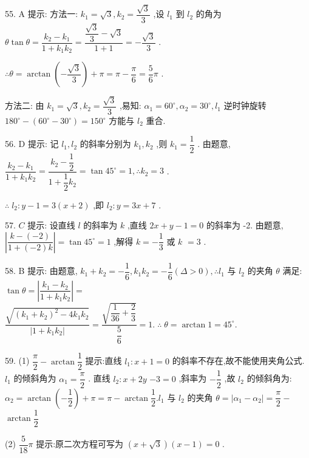 55. A 提示: 方法一: ${k}_{1} = \sqrt{3},{k}_{2} = \dfrac{\sqrt{3}}{3}$ ,设 ${l}_{1}$ 到 ${l}_{2}$ 的角为 $\theta \tan \theta  = \dfrac{{k}_{2} - {k}_{1}}{1 + {k}_{1}{k}_{2}} = \dfrac{\dfrac{\sqrt{3}}{3} - \sqrt{3}}{1 + 1} =  - \dfrac{\sqrt{3}}{3}$ .

$\therefore \theta  = \arctan \left( {-\dfrac{\sqrt{3}}{3}}\right)  + \pi  = \pi  - \dfrac{\pi }{6} = \dfrac{5}{6}\pi$ .

方法二: 由 ${k}_{1} = \sqrt{3},{k}_{2} = \dfrac{\sqrt{3}}{3}$ ,易知: ${\alpha }_{1} = {60}^{ \circ  },{\alpha }_{2} = {30}^{ \circ  },{l}_{1}$ 逆时钟旋转 ${180}^{ \circ  } - \left( {{60}^{ \circ  } - {30}^{ \circ  }}\right)  = {150}^{ \circ  }$ 方能与 ${l}_{2}$ 重合.

56. D 提示: 记 ${l}_{1},{l}_{2}$ 的斜率分别为 ${k}_{1},{k}_{2}$ ,则 ${k}_{1} = \dfrac{1}{2}$ . 由题意, $\dfrac{{k}_{2} - {k}_{1}}{1 + {k}_{1}{k}_{2}} = \dfrac{{k}_{2} - \dfrac{1}{2}}{1 + \dfrac{1}{2}{k}_{2}} = \tan {45}^{ \circ  } = 1,\therefore {k}_{2} = 3$ .

$\therefore \;{l}_{2} : y - 1 = 3\left( {x + 2}\right)$ ,即 ${l}_{2} : y = {3x} + 7$ .

57. $C$ 提示: 设直线 $l$ 的斜率为 $k$ ,直线 ${2x} + y - 1 = 0$ 的斜率为 -2. 由题意, $\left| \dfrac{k - \left( {-2}\right) }{1 + \left( {-2}\right) k}\right|  = \tan {45}^{ \circ  } = 1$ ,解得 $k =  - \dfrac{1}{3}$ 或 $k$  $= 3$ .

58. B 提示: 由题意, ${k}_{1} + {k}_{2} =  - \dfrac{1}{6},{k}_{1}{k}_{2} =  - \dfrac{1}{6}\left( {\Delta  > 0}\right) ,\therefore {l}_{1}$ 与 ${l}_{2}$ 的夹角 $\theta$ 满足: $\tan \theta  = \left| \dfrac{{k}_{1} - {k}_{2}}{1 + {k}_{1}{k}_{2}}\right|  =$  $\dfrac{\sqrt{{\left( {k}_{1} + {k}_{2}\right) }^{2} - 4{k}_{1}{k}_{2}}}{\left| 1 + {k}_{1}{k}_{2}\right| } = \dfrac{\sqrt{\dfrac{1}{36} + \dfrac{2}{3}}}{\dfrac{5}{6}} = 1.\;\therefore \;\theta  = \arctan 1 = {45}^{ \circ  }.$

59. (1) $\dfrac{\pi }{2} - \arctan \dfrac{1}{2}$ 提示:直线 ${l}_{1} : x + 1 = 0$ 的斜率不存在,故不能使用夹角公式. ${l}_{1}$ 的倾斜角为 ${\alpha }_{1} = \dfrac{\pi }{2}$ . 直线 ${l}_{2} : x + {2y}$  $- 3 = 0$ ,斜率为 $- \dfrac{1}{2}$ ,故 ${l}_{2}$ 的倾斜角为: ${\alpha }_{2} = \arctan \left( {-\dfrac{1}{2}}\right)  + \pi  = \pi  - \arctan \dfrac{1}{2}.{l}_{1}$ 与 ${l}_{2}$ 的夹角 $\theta  = \left| {{\alpha }_{1} - {\alpha }_{2}}\right|  = \dfrac{\pi }{2} -$  $\arctan \dfrac{1}{2}$

(2) $\dfrac{5}{18}\pi$ 提示:原二次方程可写为 $\left( {x + \sqrt{3}}\right) \left( {x - 1}\right)  = 0$ .

